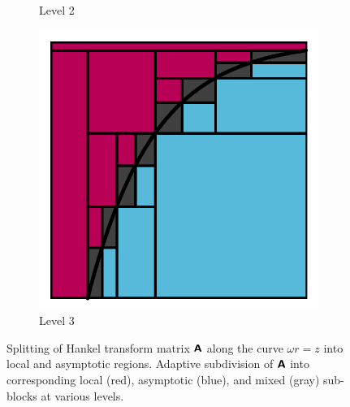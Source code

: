\begin{figure}
\begin{subfigure}[b]{0.21\textwidth}
    \caption{Level 2}
  \end{subfigure}
  \hfill
  \begin{subfigure}[b]{0.21\textwidth}
    \includegraphics[width=\textwidth, trim={\tw, \tw, \tw, \tw}, clip]{./figures/splitting_lvl3.pdf}
    \caption{Level 3}
  \end{subfigure}
  \caption{Splitting of Hankel transform matrix $\bm{\mathsf{A}}$ along the curve
  $\omega r = z$ into local and asymptotic regions. Adaptive subdivision of
  $\bm{\mathsf{A}}$ into corresponding local (red), asymptotic (blue), and mixed (gray)
  sub-blocks at various levels.}
  \label{fig:subdivide}
\end{figure}